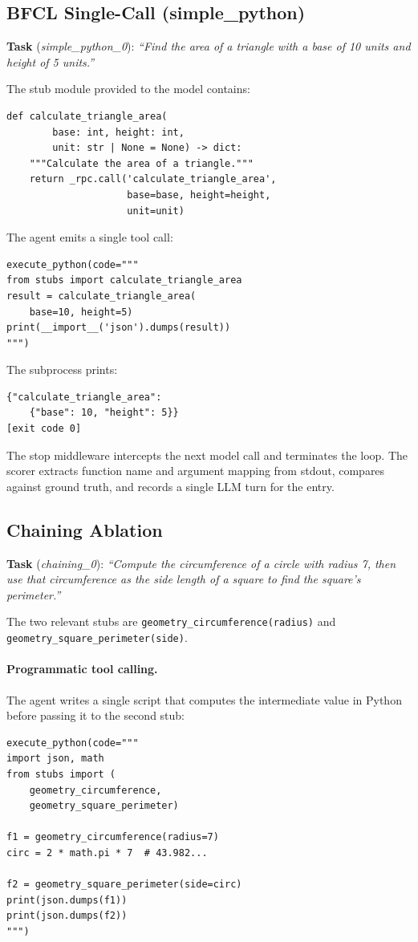 \documentclass[11pt]{article}
\newcommand{\Codemode}{Programmatic tool calling}
\begin{document}
\subsection{BFCL Single-Call (simple\_python)}
\label{app:walk_bfcl}

\textbf{Task} (\textit{simple\_python\_0}):
\emph{``Find the area of a triangle with a base of 10 units and height of 5
units.''}

The stub module provided to the model contains:
{\footnotesize\begin{verbatim}
def calculate_triangle_area(
        base: int, height: int,
        unit: str | None = None) -> dict:
    """Calculate the area of a triangle."""
    return _rpc.call('calculate_triangle_area',
                     base=base, height=height,
                     unit=unit)
\end{verbatim}
}

The agent emits a single tool call:
{\footnotesize\begin{verbatim}
execute_python(code="""
from stubs import calculate_triangle_area
result = calculate_triangle_area(
    base=10, height=5)
print(__import__('json').dumps(result))
""")
\end{verbatim}
}

The subprocess prints:
{\footnotesize\begin{verbatim}
{"calculate_triangle_area":
    {"base": 10, "height": 5}}
[exit code 0]
\end{verbatim}
}

The stop middleware intercepts the next model call and terminates the loop.
The scorer extracts function name and argument mapping from stdout, compares
against ground truth, and records a single LLM turn for the entry.

\subsection{Chaining Ablation}
\label{app:walk_chaining}

\textbf{Task} (\textit{chaining\_0}):
\emph{``Compute the circumference of a circle with radius 7, then use that
circumference as the side length of a square to find the square's perimeter.''}

The two relevant stubs are \texttt{geometry\_circumference(radius)} and
\texttt{geometry\_square\_perimeter(side)}.

\paragraph{\Codemode{}.}
The agent writes a single script that computes the intermediate value in Python
before passing it to the second stub:
{\footnotesize\begin{verbatim}
execute_python(code="""
import json, math
from stubs import (
    geometry_circumference,
    geometry_square_perimeter)

f1 = geometry_circumference(radius=7)
circ = 2 * math.pi * 7  # 43.982...

f2 = geometry_square_perimeter(side=circ)
print(json.dumps(f1))
print(json.dumps(f2))
""")
\end{verbatim}
}
\end{document}
